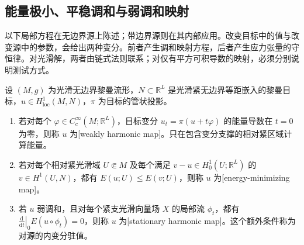 \subsection{能量极小、平稳调和与弱调和映射}
\label{g3:subsec:1802:03}

以下局部方程在无边界源上陈述；带边界源则在其内部应用。改变目标中的值与改变源中的参数，会给出两种变分。前者产生调和映射方程，后者产生应力张量的守恒律。对光滑解，两者由链式法则联系；对仅有平方可积导数的映射，必须分别说明测试方式。

\begin{definition}\label{g3:def:weak-minimizing-stationary-map}
	设 \((M,g)\) 为光滑无边界黎曼流形，\(N\subset\mathbb R^L\) 是光滑紧无边界等距嵌入的黎曼目标，\(u\in H^1_{\mathrm{loc}}(M,N)\)，\(\pi\) 为目标的管状投影。
	\begin{enumerate}
		\item 若对每个 \(\varphi\in C_c^\infty(M;\mathbb R^L)\)，目标变分 \(u_t=\pi(u+t\varphi)\) 的能量导数在 \(t=0\) 为零，则称 \(u\) 为[weakly harmonic map]。只在包含变分支撑的相对紧区域计算能量。
		\item 若对每个相对紧光滑域 \(U\Subset M\) 及每个满足 \(v-u\in H^1_0(U;\mathbb R^L)\) 的 \(v\in H^1(U,N)\)，都有 \(E(u;U)\le E(v;U)\)，则称 \(u\) 为[energy-minimizing map]。
		\item 若 \(u\) 弱调和，且对每个紧支光滑向量场 \(X\) 的局部流 \(\phi_t\)，都有 \(\left.\frac{\mathrm d}{\mathrm dt}\right|_0 E(u\circ\phi_t)=0\)，则称 \(u\) 为[stationary harmonic map]。这个额外条件称为对源的内变分驻值。
	\end{enumerate}
\end{definition}

